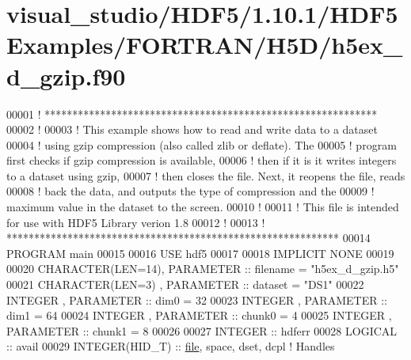 \hypertarget{visual__studio_2_h_d_f5_21_810_81_2_h_d_f5_examples_2_f_o_r_t_r_a_n_2_h5_d_2h5ex__d__gzip_8f90_source}{}\section{visual\+\_\+studio/\+H\+D\+F5/1.10.1/\+H\+D\+F5\+Examples/\+F\+O\+R\+T\+R\+A\+N/\+H5\+D/h5ex\+\_\+d\+\_\+gzip.f90}
\label{visual__studio_2_h_d_f5_21_810_81_2_h_d_f5_examples_2_f_o_r_t_r_a_n_2_h5_d_2h5ex__d__gzip_8f90_source}

\begin{DoxyCode}
00001 \textcolor{comment}{! ************************************************************}
00002 \textcolor{comment}{!}
00003 \textcolor{comment}{!  This example shows how to read and write data to a dataset}
00004 \textcolor{comment}{!  using gzip compression (also called zlib or deflate).  The}
00005 \textcolor{comment}{!  program first checks if gzip compression is available,}
00006 \textcolor{comment}{!  then if it is it writes integers to a dataset using gzip,}
00007 \textcolor{comment}{!  then closes the file.  Next, it reopens the file, reads}
00008 \textcolor{comment}{!  back the data, and outputs the type of compression and the}
00009 \textcolor{comment}{!  maximum value in the dataset to the screen.}
00010 \textcolor{comment}{!}
00011 \textcolor{comment}{!  This file is intended for use with HDF5 Library verion 1.8}
00012 \textcolor{comment}{!}
00013 \textcolor{comment}{! ************************************************************}
00014 \textcolor{keyword}{PROGRAM} main
00015 
00016   \textcolor{keywordtype}{USE }hdf5
00017 
00018   \textcolor{keywordtype}{IMPLICIT NONE}
00019 
00020   \textcolor{keywordtype}{CHARACTER(LEN=14)}, \textcolor{keywordtype}{PARAMETER} :: filename = \textcolor{stringliteral}{"h5ex\_d\_gzip.h5"}
00021   \textcolor{keywordtype}{CHARACTER(LEN=3)} , \textcolor{keywordtype}{PARAMETER} :: dataset  = \textcolor{stringliteral}{"DS1"}
00022   \textcolor{keywordtype}{INTEGER}          , \textcolor{keywordtype}{PARAMETER} :: dim0     = 32
00023   \textcolor{keywordtype}{INTEGER}          , \textcolor{keywordtype}{PARAMETER} :: dim1     = 64
00024   \textcolor{keywordtype}{INTEGER}          , \textcolor{keywordtype}{PARAMETER} :: chunk0   = 4
00025   \textcolor{keywordtype}{INTEGER}          , \textcolor{keywordtype}{PARAMETER} :: chunk1   = 8
00026 
00027   \textcolor{keywordtype}{INTEGER} :: hdferr
00028   \textcolor{keywordtype}{LOGICAL}         :: avail
00029   \textcolor{keywordtype}{INTEGER(HID\_T)}  :: \hyperlink{structfile}{file}, space, dset, dcpl \textcolor{comment}{! Handles}

\end{DoxyCode}
